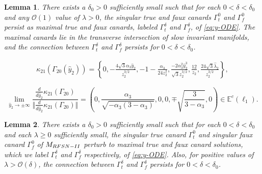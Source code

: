 \documentclass[10pt,a4paper]{amsart}
\newtheorem{lemma}{Lemma}
\begin{document}
\begin{lemma} \label{lem-persistence-true+fauxcanards-RFS}
There exists a $\delta_0>0$ sufficiently small such that for each $0<\delta<\delta_0$ and any $\mathcal{O}(1)$ value of $\lambda>0$,
the singular true and faux canards $\Gamma_t^0$ and $\Gamma_f^0$ persist as maximal true and faux canards, labeled $\Gamma_t^\delta$ and $\Gamma_f^\delta$, of \eqref{eq:y-ODE}.
The maximal canards lie in the transverse intersection of slow invariant manifolds,
and the connection between $\Gamma_t^\delta$ and $\Gamma_f^\delta$ persists for $0 < \delta< \delta_0$.
\end{lemma}

\begin{equation}\label{eq:limitGamma20}
   \begin{split}
       \kappa_{21}(\Gamma_{20}(\hat{y}_2)) = \left\{ 0, 
       -\frac{4\sqrt{3}\alpha_3 \hat{y}_2}{ z_2^{3/2}}, 
       -1-\frac{\alpha_3}{24 z_2^2}, 
       \frac{-2 \alpha_3^2\hat{y}_2^3}{\sqrt{3}z_2^{3/2}}, 
       \frac{12}{z_2}, \frac{24 \sqrt{3} \hat \lambda_2}{z_2^{3/2}} \right\}, 
   \end{split} 
\end{equation}

\begin{equation}\label{eq:limit-tanvectors}
\lim_{\hat{y}_2 \to \pm \infty} 
\frac{\frac{d}{d\hat{y}_2}\kappa_{21}(\Gamma_{20})}{\Vert \frac{d}{d\hat{y}_2}\kappa_{21}(\Gamma_{20})\Vert}
= \left(0, 
\frac{\alpha_3}{\sqrt{-\alpha_3(3-\alpha_3)}}, 
0, 0,
\mp \sqrt{\frac{3}{3 - \alpha_3}},  
0 \right) \in \mathbb E^c(\ell_1).
\end{equation}

\begin{lemma}\label{lem-persistenttrue+fauxcanards-RFSNII}
There exists a $\delta_0>0$ sufficiently small such that for each $0< \delta<\delta_0$ and each $\lambda\ge 0$ sufficiently small,
the singular true canard $\Gamma_{t}^0$ and singular faux canard $\Gamma_{f}^0$ of $M_{\rm RFSN-II}$ perturb to maximal true and faux canard solutions,  which we label $\Gamma_{t}^{\delta}$ and $\Gamma_{f}^{\delta}$ respectively, of \eqref{eq:y-ODE}.
Also, for positive values of $\lambda > \mathcal{O}(\delta)$, the connection between $\Gamma_t^\delta$ and $\Gamma_f^\delta$ persists for $0<\delta<\delta_0$.
\end{lemma}
\end{document}

